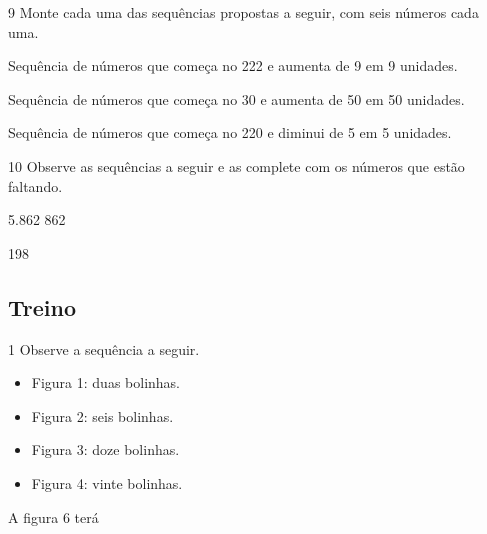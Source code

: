 \begin{mdframed}[linewidth=2pt,linecolor=salmao,roundcorner=2pt]
\num{9} Monte cada uma das sequências propostas a seguir, com seis números cada uma.

\begin{escolha}
\item
  Sequência de números que começa no 222 e aumenta de 9 em 9 unidades.


\item
  Sequência de números que começa no 30 e aumenta de 50 em 50 unidades.


\item
  Sequência de números que começa no 220 e diminui de 5 em 5 unidades.

\end{escolha}

\num{10} Observe as sequências a seguir e as complete com os números que estão
faltando.

\begin{escolha}
\item 5.862   \quad {}\quad {}  862

\item 198   \quad {}
\end{escolha}

\subsection{Treino}

\num{1} Observe a sequência a seguir.

\begin{itemize}
  \item Figura 1: duas bolinhas.
  \item Figura 2: seis bolinhas.
  \item Figura 3: doze bolinhas.
  \item Figura 4: vinte bolinhas.
\end{itemize}

 A figura 6 terá


\end{mdframed}
